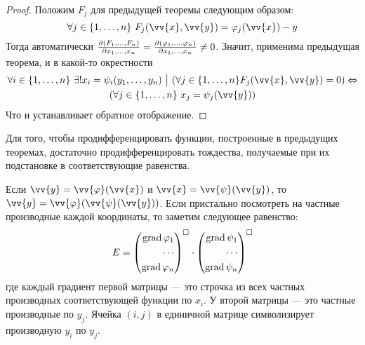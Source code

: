 \begin{proof}
	Положим $F_j$ для предыдущей теоремы следующим образом:
	\[
		\forall j \in \range{n}\ F_j(\vv{x}, \vv{y}) = \phi_j(\vv{x}) - y
	\]
	Тогда автоматически $\frac{\partial (F_1, \ldots, F_n)}{\partial x_1, \ldots, x_n} = \frac{\partial (\varphi_1, \ldots, \varphi_n)}{\partial x_1, \ldots, x_n} \neq 0$. Значит, применима предыдущая теорема, и в какой-то окрестности
	\begin{multline*}
		\forall i \in \range{n}\ \exists! x_i = \psi_i(y_1, \ldots, y_n) \such (\forall j \in \range{n} F_j(\vv{x}, \vv{y}) = 0) \Lra
		\\
		(\forall j \in \range{n}\ x_j = \psi_j(\vv{y}))
	\end{multline*}
	Что и устанавливает обратное отображение.
\end{proof}

\begin{note}
	Для того, чтобы продифференцировать функции, построенные в предыдущих теоремах, достаточно продифференцировать тождества, получаемые при их подстановке в соответствующие равенства.
	
	Если $\vv{y} = \vv{\phi}(\vv{x})$ и $\vv{x} = \vv{\psi}(\vv{y})$, то $\vv{y} = \vv{\phi}(\vv{\psi}(\vv{y}))$. Если пристально посмотреть на частные производные каждой координаты, то заметим следующее равенство:
	\[
		E = \left(\begin{aligned}\operatorname{grad} \varphi_1 \\ \cdots \\ \operatorname{grad} \varphi_n\end{aligned}\right)^{\square} \cdot \left(\begin{aligned}\operatorname{grad} \psi_1 \\ \cdots \\ \operatorname{grad} \psi_n\end{aligned}\right)^{\square}
	\]
	где каждый градиент первой матрицы --- это строчка из всех частных производных соответствующей функции по $x_i$. У второй матрицы --- это частные производные по $y_j$. Ячейка $(i, j)$ в единичной матрице символизирует производную $y_i$ по $y_j$.
\end{note}